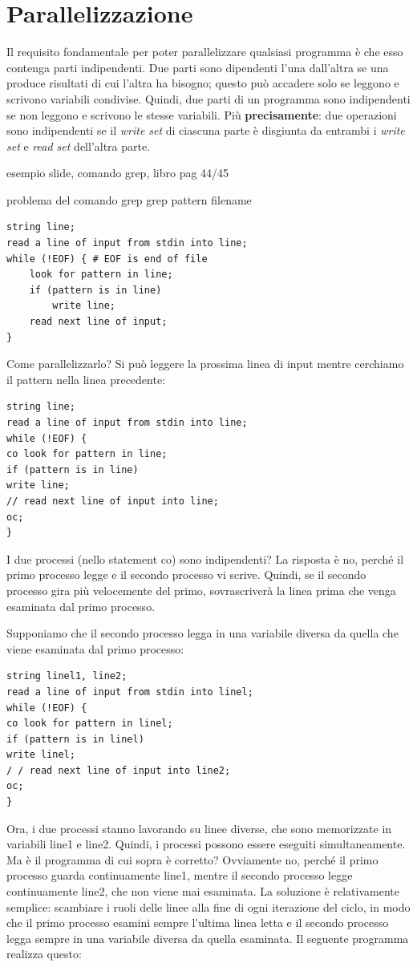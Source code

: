 \documentclass[10pt,a4paper]{book}
\begin{document}
\section{Parallelizzazione}
Il requisito fondamentale per poter parallelizzare qualsiasi programma è che esso contenga parti indipendenti. Due parti sono dipendenti l'una dall'altra se una produce risultati di cui l'altra ha bisogno; questo può accadere solo se leggono e scrivono variabili condivise.
Quindi, due parti di un programma sono indipendenti se non leggono e scrivono le stesse variabili.
Più \textbf{precisamente}: due operazioni sono indipendenti se il \textit{write set} di ciascuna parte è disgiunta da entrambi i \textit{write set} e \textit{read set} dell'altra parte.

esempio slide, comando grep, libro pag 44/45

problema del comando grep
grep pattern filename

\begin{verbatim}
string line;
read a line of input from stdin into line;
while (!EOF) { # EOF is end of file
	look for pattern in line;
	if (pattern is in line)
		write line;
	read next line of input;
}
\end{verbatim}

Come parallelizzarlo?
Si può leggere la prossima linea di input mentre cerchiamo il pattern nella linea precedente:

\begin{verbatim}
string line;
read a line of input from stdin into line;
while (!EOF) {
co look for pattern in line;
if (pattern is in line)
write line;
// read next line of input into line;
oc;
}
\end{verbatim}

I due processi (nello statement co) sono indipendenti? La risposta è no, perché il primo processo legge e il secondo processo vi scrive. Quindi, se il secondo processo gira più velocemente del primo, sovrascriverà la linea prima che venga esaminata dal primo processo.

Supponiamo che il secondo processo legga in una variabile diversa da quella che viene esaminata dal primo processo:
\begin{verbatim}
string linel1, line2;
read a line of input from stdin into linel;
while (!EOF) {
co look for pattern in linel;
if (pattern is in linel)
write linel;
/ / read next line of input into line2;
oc;
}
\end{verbatim}

Ora, i due processi stanno lavorando su linee diverse, che sono memorizzate in variabili line1 e line2. Quindi, i processi possono essere eseguiti simultaneamente. Ma è il programma di cui sopra è corretto? Ovviamente no, perché il primo processo guarda continuamente line1, mentre il secondo processo legge continuamente line2, che non viene mai esaminata.
La soluzione è relativamente semplice: scambiare i ruoli delle linee alla fine di ogni iterazione del ciclo, in modo che il primo processo esamini sempre l'ultima linea letta e il secondo processo legga sempre in una variabile diversa da quella esaminata. Il seguente programma realizza questo:
\end{document}
